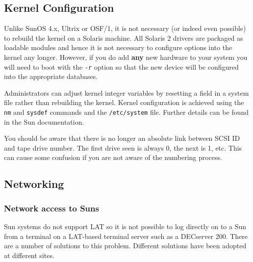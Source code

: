 \subsection{Kernel Configuration}

Unlike SunOS 4.x, Ultrix or OSF/1, it is not necessary (or indeed even
possible) to rebuild the kernel on a Solaris machine. All Solaris 2
drivers are packaged as loadable modules and hence it is not necessary to
configure options into the kernel any longer. However, if you do add {\bf any}
new hardware to your system you will need to boot with the \verb+-r+ option
so that the new device will be configured into the appropriate databases.

Administrators can adjust kernel 
integer variables by resetting a field in a system file rather than
rebuilding the kernel. Kernel configuration is achieved using the 
\verb+nm+ and \verb+sysdef+ commands and the \verb+/etc/system+ file.
Further details can be found in the Sun documentation. 

You should be aware that there is no longer an absolute link between
SCSI ID and tape drive number. The first drive seen is always 0, the next
is 1, etc. This can cause some confusion if you are not aware of the 
numbering process. 

\subsection{Networking}

\subsubsection{Network access to Suns}

Sun systems do not support LAT so it is not possible to log directly on to 
a Sun from a terminal on a LAT-based terminal server such as a DECserver 200.
There are a number of solutions to this problem. Different solutions
have been adopted at different sites.
                                 
